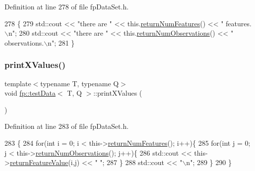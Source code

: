 Definition at line 278 of file fp\+Data\+Set.\+h.


\begin{DoxyCode}
278                              \{
279             std::cout << \textcolor{stringliteral}{"there are "} << this.\hyperlink{classfp_1_1testData_a8a04f896ee478d7c5cb37aeedfe7b821}{returnNumFeatures}() << \textcolor{stringliteral}{" features.\(\backslash\)n"};
280             std::cout << \textcolor{stringliteral}{"there are "} << this.\hyperlink{classfp_1_1testData_af9dd7a4aa116d99a11838a02f2154c08}{returnNumObservations}() << \textcolor{stringliteral}{"
       observations.\(\backslash\)n"};
281         \}
\end{DoxyCode}
\mbox{\label{classfp_1_1testData_ae15cf957ad0b7339d6956aae12bba197}} 
\subsubsection{\texorpdfstring{print\+X\+Values()}{printXValues()}}
{\footnotesize\ttfamily template$<$typename T, typename Q$>$ \\
void \hyperlink{classfp_1_1testData}{fp\+::test\+Data}$<$ T, Q $>$\+::print\+X\+Values (\begin{DoxyParamCaption}{ }\end{DoxyParamCaption})\hspace{0.3cm}{\ttfamily [inline]}}



Definition at line 283 of file fp\+Data\+Set.\+h.


\begin{DoxyCode}
283                            \{
284             \textcolor{keywordflow}{for}(\textcolor{keywordtype}{int} i = 0; i < this->\hyperlink{classfp_1_1testData_a8a04f896ee478d7c5cb37aeedfe7b821}{returnNumFeatures}(); i++)\{
285                 \textcolor{keywordflow}{for}(\textcolor{keywordtype}{int} j = 0; j < this->\hyperlink{classfp_1_1testData_af9dd7a4aa116d99a11838a02f2154c08}{returnNumObservations}(); j++)\{
286                     std::cout << this->\hyperlink{classfp_1_1testData_a0c49c5fc2f1bf3fc39c7d55413cddabf}{returnFeatureValue}(i,j) << \textcolor{stringliteral}{" "};
287                 \}
288                 std::cout << \textcolor{stringliteral}{"\(\backslash\)n"};
289             \}
290         \}
\end{DoxyCode}
\mbox{\label{classfp_1_1testData_a69269ee27e1c3fb5d3d5ff120a3d7300}} 
